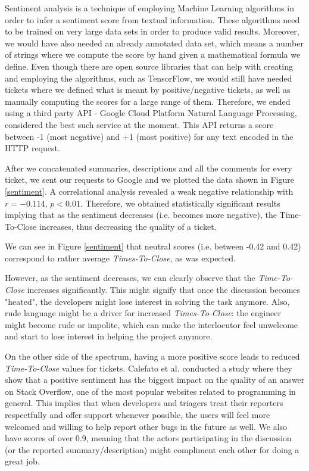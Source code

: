 \documentclass{mpaper}
\begin{document}
Sentiment analysis is a technique of employing Machine Learning algorithms in order to infer a sentiment 
score from textual information. These algorithms need to be trained on very large data sets in order to 
produce valid results. Moreover, we would have also needed an already annotated data set, which means 
a number of strings where we compute the score by hand given a mathematical formula we define. Even though 
there are open source libraries that can help with creating and employing the algorithms, such as TensorFlow, 
we would still have needed tickets where we defined what is meant by positive/negative tickets, as well as
manually computing the scores for a large range of them. Therefore, we ended using a third party API - Google 
Cloud Platform Natural Language Processing, considered the best such service at the moment. This API returns 
a score between -1 (most negative) and +1 (most positive) for any text encoded in the HTTP request.

After we concatenated summaries, descriptions and all the comments for every ticket, we sent our 
requests to Google and we plotted the data shown in Figure \ref{sentiment}. A correlational analysis revealed a 
weak negative relationship with $r = -0.114$, $p < 0.01$. Therefore, we obtained statistically significant 
results implying that as the sentiment decreases (i.e. becomes more negative), the Time-To-Close increases, thus 
decreasing the quality of a ticket.

We can see in Figure \ref{sentiment} that neutral scores (i.e. between -0.42 and 0.42) correspond to rather 
average \emph{Times-To-Close}, as was expected.

However, as the sentiment decreases, we can clearly observe that the \emph{Time-To-Close} increases significantly. 
This might signify that once the discussion becomes "heated", the developers might lose interest in solving 
the task anymore. Also, rude language might be a driver for increased \emph{Times-To-Close}: the engineer might become 
rude or impolite, which can make the interlocutor feel unwelcome and start to lose interest in helping the project anymore. 

On the other side of the spectrum, having a more positive score leads to reduced \emph{Time-To-Close} values for tickets. Calefato et al. 
\cite{calefato2015mining} conducted a study where they show that a positive sentiment has the biggest impact on 
the quality of an answer on Stack Overflow, one of the most popular websites related to programming in general. This 
implies that when developers and triagers treat their reporters respectfully and offer support whenever possible, 
the users will feel more welcomed and willing to help report other bugs in the future as well. We also have scores of 
over 0.9, meaning that the actors participating in the discussion (or the reported summary/description) might compliment 
each other for doing a great job.
\end{document}
